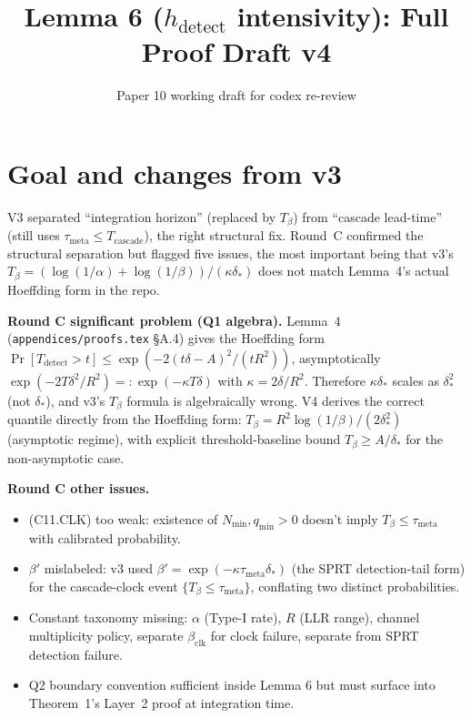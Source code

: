 \documentclass{article}
\title{Lemma 6 ($h_{\mathrm{detect}}$ intensivity): Full Proof Draft v4}
\author{Paper 10 working draft for codex re-review}
\date{}
\newcommand{\deltastar}{\delta_{*}}
\newcommand{\Tbeta}{T_{\beta}}
\newcommand{\bclk}{\beta_{\mathrm{clk}}}
\begin{document}
\maketitle

\section{Goal and changes from v3}

V3 separated ``integration horizon'' (replaced by $\Tbeta$) from
``cascade lead-time'' (still uses $\tau_{\mathrm{meta}} \leq
T_{\mathrm{cascade}}$), the right structural fix.  Round~C confirmed
the structural separation but flagged five issues, the most
important being that v3's $\Tbeta = (\log(1/\alpha) +
\log(1/\beta))/(\kappa \deltastar)$ does not match Lemma~4's
actual Hoeffding form in the repo.

\textbf{Round C significant problem (Q1 algebra).}  Lemma~4
(\texttt{appendices/proofs.tex} §A.4) gives the Hoeffding form
$\Pr[T_{\mathrm{detect}} > t] \leq \exp(-2(t\delta - A)^2/(tR^2))$,
asymptotically $\exp(-2T\delta^2/R^2) =: \exp(-\kappa T \delta)$
with $\kappa = 2\delta/R^2$.  Therefore $\kappa \deltastar$ scales as
$\deltastar^2$ (not $\deltastar$), and v3's $\Tbeta$ formula is
algebraically wrong.  V4 derives the correct quantile directly from
the Hoeffding form: $\Tbeta = R^2 \log(1/\beta)/(2 \deltastar^2)$
(asymptotic regime), with explicit threshold-baseline bound
$\Tbeta \geq A/\deltastar$ for the non-asymptotic case.

\textbf{Round C other issues.}
\begin{itemize}
\item (C11.CLK) too weak: existence of $N_{\min}, q_{\min} > 0$
  doesn't imply $\Tbeta \leq \tau_{\mathrm{meta}}$ with calibrated
  probability.
\item $\beta'$ mislabeled: v3 used $\beta' = \exp(-\kappa
  \tau_{\mathrm{meta}} \deltastar)$ (the SPRT detection-tail form)
  for the cascade-clock event $\{\Tbeta \leq \tau_{\mathrm{meta}}\}$,
  conflating two distinct probabilities.
\item Constant taxonomy missing: $\alpha$ (Type-I rate), $R$ (LLR
  range), channel multiplicity policy, separate $\bclk$ for clock
  failure, separate from SPRT detection failure.
\item Q2 boundary convention sufficient inside Lemma 6 but must
  surface into Theorem~1's Layer~2 proof at integration time.
\end{itemize}
\end{document}

